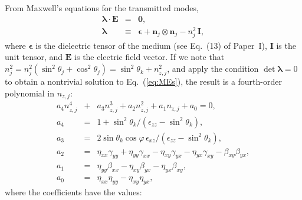 \documentclass{aa}
\newcommand{\req}[1]{Eq.~(\ref{#1})}
\begin{document}
From Maxwell's equations for the transmitted modes,
\begin{eqnarray}
\label{eq:MEs}
{\bm\lambda}\cdot \bm{E} & = & \mathbf{0},\\
{\bm\lambda} & \equiv & {\bm\epsilon} + \bm{n}_j\otimes\bm{n}_j -
n^2_j\,\mathbf{I},
\end{eqnarray}  
where ${\bm\epsilon}$ is the dielectric tensor of the medium
(see Eq.~(13) of Paper~I),  $\mathbf{I}$ is the unit
tensor, and $\bm{E}$ is the electric field vector.  If we
note that  $n^2_j =
n^2_j\left(\sin^2\theta_j+\cos^2\theta_j\right) =
\sin^2\theta_k + n^2_{z,j}$, and apply the condition 
$\det{{\bm\lambda}} = 0$ to obtain a nontrivial solution to
\req{eq:MEs}, the result is a fourth-order polynomial in
$n_{z,j}$:
\begin{eqnarray}
\label{eq:polynj}
a_4 n^4_{z,j} & + & a_3 n^3_{z,j} + a_2 n^2_{z,j} + a_1
n_{z,j} + a_0 = 0,\\
a_4 & = & 1 + \sin^2\theta_k/\left(\epsilon_{zz} -
\sin^2\theta_k\right),\\
a_3 & = &
2\sin\theta_k\cos\varphi\,\epsilon_{xz}/\left(\epsilon_{zz} -
\sin^2\theta_k\right),\\
a_2 & = & \eta_{xx}\gamma_{yy} + \eta_{yy}\gamma_{xx} -
\eta_{xy}\gamma_{yx} -
\eta_{yx}\gamma_{xy}-\beta_{xy}\beta_{yx},\\
a_1 & = & \eta_{yy}\beta_{xx} - \eta_{xy}\beta_{yx} -
\eta_{yx}\beta_{xy},\\
a_0 & = & \eta_{xx}\eta_{yy} - \eta_{xy}\eta_{yx},
\end{eqnarray}
where the coefficients have the values:
\end{document}
